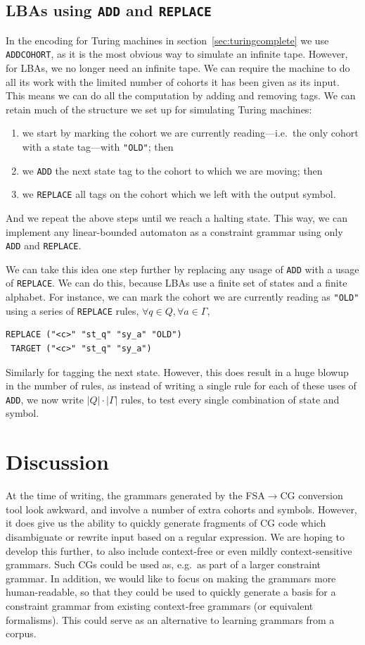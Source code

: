 \documentclass[11pt]{article}
\def\t#1{\texttt{#1}}
\begin{document}
\subsection{LBAs using \t{ADD} and \t{REPLACE}}
In the encoding for Turing machines in section~\ref{sec:turingcomplete} we use
\t{ADDCOHORT}, as it is the most obvious way to simulate an infinite tape.
However, for LBAs, we no longer need an infinite tape. We can require the
machine to do all its work with the limited number of cohorts it has been given
as its input. This means we can do all the computation by adding and removing
tags. We can retain much of the structure we set up for simulating Turing
machines:
\begin{enumerate}
\item%
  we start by marking the cohort we are currently reading---i.e.\ the only
  cohort with a state tag---with \t{"OLD"}; then 
\item%
  we \t{ADD} the next state tag to the cohort to which we are moving; then
\item%
  we \t{REPLACE} all tags on the cohort which we left with the output symbol.
\end{enumerate}
And we repeat the above steps until we reach a halting state. This way, we can
implement any linear-bounded automaton as a constraint grammar using only
\t{ADD} and \t{REPLACE}.

We can take this idea one step further by replacing any usage of \t{ADD} with a
usage of \t{REPLACE}. We can do this, because LBAs use a finite set of states
and a finite alphabet. For instance, we can mark the cohort we are currently
reading as \t{"OLD"} using a series of \t{REPLACE} rules, $\forall q \in Q,
\forall a \in \Gamma,$
\begin{Verbatim}
REPLACE ("<c>" "st_q" "sy_a" "OLD") 
 TARGET ("<c>" "st_q" "sy_a")
\end{Verbatim}
Similarly for tagging the next state.
However, this does result in a huge blowup in the number of rules, as instead of
writing a single rule for each of these uses of \t{ADD}, we now write $|Q| \cdot
|\Gamma|$ rules, to test every single combination of state and symbol.

\section{Discussion}
At the time of writing, the grammars generated by the FSA$\rightarrow$CG
conversion tool look awkward, and involve a number of extra cohorts and symbols.
However, it does give us the ability to quickly generate fragments of CG code
which disambiguate or rewrite input based on a regular expression.
We are hoping to develop this further, to also include context-free or even
mildly context-sensitive grammars.
Such CGs could be used as, e.g.\ as part of a larger constraint grammar.
In addition, we would like to focus on making the grammars more human-readable,
so that they could be used to quickly generate a basis for a constraint grammar
from existing context-free grammars (or equivalent formalisms).
This could serve as an alternative to learning grammars from a corpus.
\end{document}
